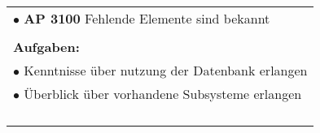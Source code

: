 \begin{table}[!h]
\begin{center}
\begin{tabular}{|p{35mm}||p{55mm}|p{50mm}||p{40mm}|}
	 \multicolumn{4}{|p{150mm}|}{$\bullet$ \textbf{AP 3100} Fehlende Elemente sind bekannt}\\
   \multicolumn{4}{|p{150mm}|}{}\\
   \multicolumn{4}{|p{150mm}|}{\textbf{Aufgaben:}}\\
   \multicolumn{4}{|p{150mm}|}{$\bullet$ Kenntnisse über nutzung der Datenbank erlangen}\\
   \multicolumn{4}{|p{150mm}|}{$\bullet$ Überblick über vorhandene Subsysteme erlangen}\\
   \multicolumn{4}{|p{150mm}|}{}\\
   \multicolumn{4}{|p{150mm}|}{\textbf{}}\\
   \multicolumn{4}{|p{150mm}|}{}\\
   \multicolumn{4}{|p{150mm}|}{}\\
   \hline
  \end{tabular}
 \end{center}
\end{table}

